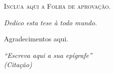 

\newpage
\thispagestyle{empty}
\vspace*{\fill}
\begin{center}
    \textsc{Inclua aqui a Folha de aprovação.}
\end{center}
\vspace*{\fill}
\newpage
%	
\cleardoublepage

\begin{dedicatoria}
    \thispagestyle{empty}
		\vspace*{\fill}
    \centering
    \noindent
    \textit{Dedico esta tese à todo mundo.}
    \vspace*{\fill}
\end{dedicatoria}

\begin{agradecimentos}
    \thispagestyle{empty}
    Agradecimentos aqui.
\end{agradecimentos}


\begin{epigrafe}
	\thispagestyle{empty}
    \vspace*{\fill}
	\begin{flushright}
		\textit{``Escreva aqui a sua epígrafe''\\
		(Citação)}
	\end{flushright}
\end{epigrafe}


